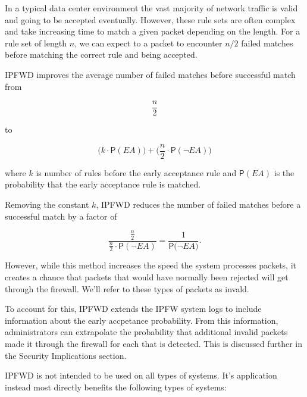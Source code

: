 \documentclass[journal]{IEEEtran}
\begin{document}
In a typical data center environment the vast majority of network traffic is
valid and going to be accepted eventually. However, these rule sets are often
complex and take increasing time to match a given packet depending on the
length. For a rule set of length $n$, we can expect to a packet to encounter
$n/2$ failed matches before matching the correct rule and being accepted.

IPFWD improves the average number of failed matches before successful match
from

\[
\frac{n}{2}
\]

to

\[
\Big(k \cdot \mathsf{P}(\textit{EA})\Big) + 
\Big(\frac{n}{2} \cdot \mathsf{P}(\neg{\textit{EA}})\Big) 
\]

where $k$ is number of rules before the early acceptance rule and
$\mathsf{P}(\textit{EA})$ is the probability that the early acceptance rule is
matched.

Removing the constant $k$, IPFWD reduces the number of failed matches before a
successful match by a factor of

\[
\frac
    {\frac{n}{2}}
    {\frac{n}{2} \cdot \mathsf{P}(\neg{\textit{EA}})} 
= \frac{1}{\mathsf{P}(\neg{\textit{EA})}}.
\]

However, while this method increases the speed the system processes packets, it
creates a chance that packets that would have normally been rejected will get
through the firewall. We'll refer to these types of packets as invald.

To account for this, IPFWD extends the IPFW system logs to include information
about the early accpetance probability. From this information, administrators
can extrapolate the probability that additional invalid packets made it through
the firewall for each that is detected. This is discussed further in the
Security Implications section.

IPFWD is not intended to be used on all types of systems. It's application
instead most directly benefits the following types of systems:
\end{document}
